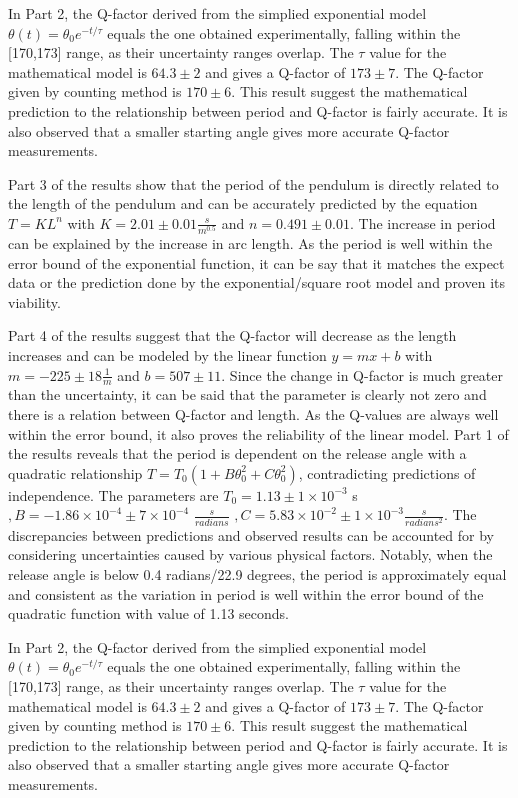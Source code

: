 \documentclass{article}
\begin{document}
In Part 2, the Q-factor derived from the simplied exponential model $\theta(t) = \theta_0 e^{-t/\tau}$ equals the one obtained experimentally, falling within the [170,173] range, as their uncertainty ranges overlap. The $\tau$ value for the mathematical model  is $64.3 \pm 2$ and gives a Q-factor of $173 \pm 7$. The Q-factor given by counting method is $170 \pm 6$. This result suggest the mathematical prediction to the relationship between period and Q-factor is fairly accurate. It is also observed that a smaller starting angle gives more accurate Q-factor measurements.

Part 3 of the results show that the period of the pendulum is directly related to the length of the pendulum and can be accurately predicted by the equation $T = KL^n$ with $K = 2.01 \pm 0.01\frac{s}{m^{0.5}}$ and $n = 0.491 \pm 0.01$. The increase in period can be explained by the increase in arc length. As the period is well within the error bound of the exponential function, it can be say that it matches the expect data or the prediction done by the exponential/square root model and proven its viability. 

Part 4 of the results suggest that the Q-factor will decrease as the length increases and can be modeled by the linear function $y = mx + b$ with $m = -225 \pm 18\frac{1}{m}$ and $b = 507 \pm 11$. Since the change in Q-factor is much greater than the uncertainty, it can be said that the parameter is clearly not zero and there is a relation between Q-factor and length. As the Q-values are always well within the error bound, it also proves the reliability of the linear model.
Part 1 of the results reveals that the period is dependent on the release angle with a quadratic relationship $T = T_0(1 + B\theta_0^2 + C\theta_0^2)$, contradicting predictions of independence. The parameters are $T_0 = 1.13  \pm 1\times10^{-3} $ s $, B = -1.86\times10^{-4}  \pm 7\times10^{-4}$ $\frac{s}{radians}$ $, C = 5.83\times10^{-2} \pm 1\times10^{-3} \frac{s}{radians^2}$. The discrepancies between predictions and observed results can be accounted for by considering uncertainties caused by various physical factors. Notably, when the release angle is below 0.4 radians/22.9 degrees, the period is approximately equal and consistent as the variation in period is well within the error bound of the quadratic function with value of 1.13 seconds.

In Part 2, the Q-factor derived from the simplied exponential model $\theta(t) = \theta_0 e^{-t/\tau}$ equals the one obtained experimentally, falling within the [170,173] range, as their uncertainty ranges overlap. The $\tau$ value for the mathematical model  is $64.3 \pm 2$ and gives a Q-factor of $173 \pm 7$. The Q-factor given by counting method is $170 \pm 6$. This result suggest the mathematical prediction to the relationship between period and Q-factor is fairly accurate. It is also observed that a smaller starting angle gives more accurate Q-factor measurements.
\end{document}
